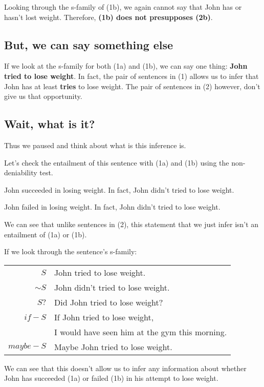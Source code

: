 \documentclass{article}
\begin{document}
Looking through the s-family of (1b), we again cannot say that John has or hasn't lost weight. Therefore, \textbf{(1b) does not presupposes (2b)}.

\subsection{But, we can say something else}
If we look at the s-family for both (1a) and (1b), we can say one thing: \textbf{John tried to lose weight}. In fact, the pair of sentences in (1) allows us to infer that John has at least \textbf{tries} to lose weight. The pair of sentences in (2) however, don't give us that opportunity. 

\subsection{Wait, what is it?}
Thus we paused and think about what is this inference is. 

Let's check the entailment of this sentence with (1a) and (1b) using the non-deniability test.

John succeeded in losing weight. In fact, John didn't tried to lose weight.

John failed in losing weight. In fact, John didn't tried to lose weight.

We can see that unlike sentences in (2), this statement that we just infer isn't an entailment of (1a) or (1b). 

If we look through the sentence's s-family:

\begin{center}
\begin{tabular}{r|l}
    $S$         & John tried to lose weight.\\
    $\sim S$    & John didn't tried to lose weight.\\
    $S?$        & Did John tried to lose weight?\\
    $if-S$      & If John tried to lose weight,\\
                & I would have seen him at the gym this morning.\\
    $maybe-S$   & Maybe John tried to lose weight.\\
\end{tabular}
\end{center}

We can see that this doesn't allow us to infer any information about whether John has succeeded (1a) or failed (1b) in his attempt to lose weight.
\end{document}
